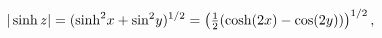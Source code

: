 \[|\mathop{\sinh\/}\nolimits z|=({\mathop{\sinh\/}\nolimits^{2}}x+{\mathop{\sin%
\/}\nolimits^{2}}y)^{1/2}=\left(\tfrac{1}{2}(\mathop{\cosh\/}\nolimits\!\left(%
2x\right)-\mathop{\cos\/}\nolimits\!\left(2y\right))\right)^{1/2},\]